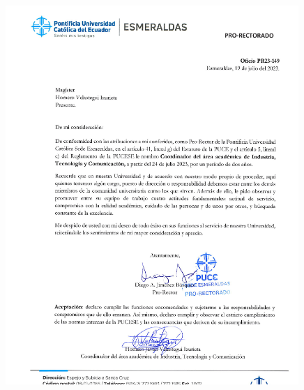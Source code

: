 
\begin{figure}[ht]
    \setlength{\parindent}{-25pt}
    \includegraphics[width=0.99\textwidth]{1.-Perfil/Certificados/Puce.pdf}
\end{figure}

